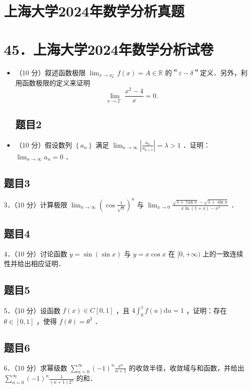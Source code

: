 \documentclass{article}
\begin{document}
\section*{上海大学2024年数学分析真题}
\section*{45．上海大学2024年数学分析试卷}
\begin{itemize}

\subsection{题目1}
  \item[1．] （10 分）叙述函数极限 \(\lim _{x \rightarrow x_{0}^{-}} f(x)=A \in \mathbb{R}\) 的＂\(\varepsilon-\delta\)＂定义．另外，利用函数极限的定义来证明
\[
\lim _{x \rightarrow 2^{-}} \frac{x^{2}-4}{x}=0 .
\]

\subsection{题目2}
  \item[2．] （10 分）假设数列 \(\left\{a_{n}\right\}\) 满足 \(\lim _{n \rightarrow \infty}\left|\frac{a_{n}}{a_{n+1}}\right|=\lambda>1\) ．证明： \(\lim _{n \rightarrow \infty} a_{n}=0\) ．
\end{itemize}

\subsection{题目3}
3．（10 分）计算极限 \(\lim _{n \rightarrow \infty}\left(\cos \frac{1}{\sqrt{n}}\right)^{n}\) 与 \(\lim _{x \rightarrow 0} \frac{\sqrt{1+\tan x}-\sqrt{1+\sin x}}{x \ln (1+x)-x^{2}}\) ．

\subsection{题目4}
4．（10 分）讨论函数 \(y=\sin (\sin x)\) 与 \(y=x \cos x\) 在 \([0,+\infty)\) 上的一致连续性并给出相应证明．

\subsection{题目5}
5．（10 分）设函数 \(f(x) \in C[0,1]\) ，且 \(4 \int_{0}^{1} f(u) \mathrm{d} u=1\) ，证明：存在 \(\theta \in[0,1]\) ，使得 \(f(\theta)=\theta^{3}\) ．

\subsection{题目6}
6．（10 分）求幂级数 \(\sum_{n=0}^{\infty}(-1)^{n} \frac{x^{n}}{n+1}\) 的收敛半径，收敛域与和函数，并给出 \(\sum_{n=0}^{\infty}(-1)^{n} \frac{1}{(n+1) 2^{n}}\) 的和．
\end{document}
